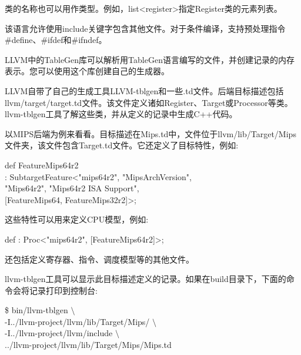 类的名称也可以用作类型。例如，list<register>指定Register类的元素列表。\par

该语言允许使用include关键字包含其他文件。对于条件编译，支持预处理指令\#define、\#ifdef和\#ifndef。\par

LLVM中的TableGen库可以解析用TableGen语言编写的文件，并创建记录的内存表示。您可以使用这个库创建自己的生成器。\par

LLVM自带了自己的生成工具LLVM-tblgen和一些.td文件。后端目标描述包括llvm/target/\allowbreak target.td文件。该文件定义诸如Register、Target或Processor等类。llvm-tblgen工具了解这些类，并从定义的记录中生成C++代码。\par

以MIPS后端为例来看看。目标描述在Mips.td中，文件位于llvm/lib/Target/Mips文件夹，该文件包含Target.td文件。它还定义了目标特性，例如:\par

\begin{tcolorbox}[colback=white,colframe=black]
def FeatureMips64r2 \\
\hspace*{0.5cm}: SubtargetFeature<"mips64r2", "MipsArchVersion",  \\
\hspace*{4cm}"Mips64r2", "Mips64r2 ISA Support", \\
\hspace*{4cm}[FeatureMips64, FeatureMips32r2]>;
\end{tcolorbox}

这些特性可以用来定义CPU模型，例如:\par

\begin{tcolorbox}[colback=white,colframe=black]
def : Proc<"mips64r2", [FeatureMips64r2]>;
\end{tcolorbox}

还包括定义寄存器、指令、调度模型等的其他文件。\par

llvm-tblgen工具可以显示此目标描述定义的记录。如果在build目录下，下面的命令会将记录打印到控制台:\par

\begin{tcolorbox}[colback=white,colframe=black]
\$ bin/llvm-tblgen $\setminus$ \\
\hspace*{0.5cm}-I../llvm-project/llvm/lib/Target/Mips/ $\setminus$ \\
\hspace*{0.5cm}-I../llvm-project/llvm/include $\setminus$ \\
\hspace*{0.5cm}../llvm-project/llvm/lib/Target/Mips/Mips.td
\end{tcolorbox}

